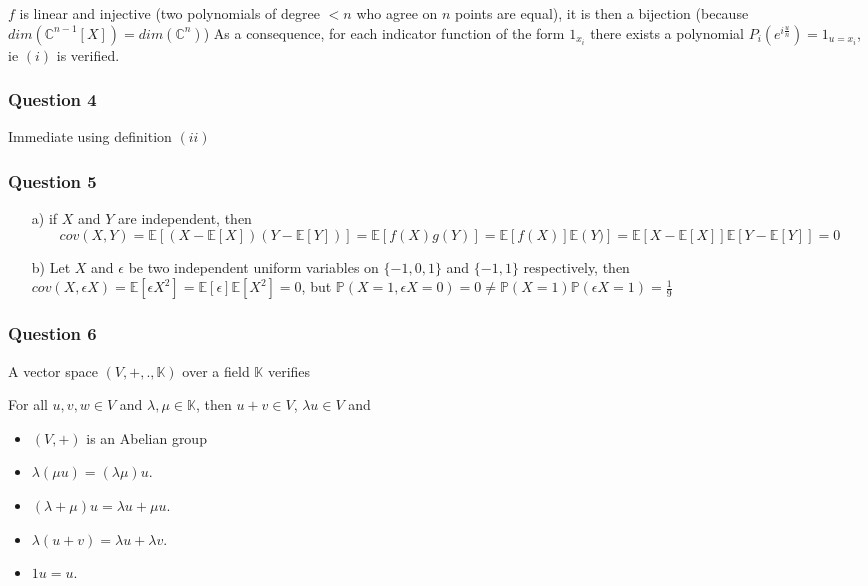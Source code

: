 \documentclass[12pt]{article}
\newcommand{\Q}[1]{\subsubsection*{Question #1}}
\begin{document}
$f$ is linear and injective (two polynomials of degree $< n$ who agree on $n$ points are equal), it is then a bijection (because $dim(\mathbb{C}^{n-1}[X]) = dim( \mathbb{C}^n )$)
As a consequence, for each indicator function of the form $1_{x_i}$ there exists a polynomial $P_i(e^{i \frac{u}{n}}) = 1_{u = x_i}$, ie $(i)$ is verified.

\Q{4} 
Immediate using definition $(ii)$

\Q{5}
\begin{itemize}
\item [a)] if $X$ and $Y$ are independent, then
  $$cov(X, Y) = \mathbb{E}\left[(X - \mathbb{E}[X]) (Y - \mathbb{E}[Y]) \right] = \mathbb{E}\left[f(X)g(Y) \right] = \mathbb{E}\left[f(X) \right]\mathbb{E}\left(Y) \right] = \mathbb{E}[X - \mathbb{E}[X]] \mathbb{E}[Y - \mathbb{E}[Y]] = 0$$
\item [b)] Let $X$ and $\epsilon$ be two independent uniform variables on $\{-1, 0, 1\}$ and $\{-1, 1\}$ respectively, then $cov(X, \epsilon X) = \mathbb{E}[\epsilon X^2]  = \mathbb{E}[\epsilon] \mathbb{E}[X^2] = 0$, but $\mathbb{P}(X = 1, \epsilon X = 0) = 0 \neq \mathbb{P}(X = 1) \mathbb{P}(\epsilon X = 1) = \frac{1}{9}$
\end{itemize}

\Q{6}
A vector space $(V,+,.,{\mathbb K})$ over a field $\mathbb K$ verifies

For all $u,v,w\in V$ and $\lambda, \mu \in \mathbb K$, then $u+v\in V$, $\lambda u\in V$ and

\begin{itemize}
\item $(V,+)$ is an Abelian group
\item $\lambda(\mu u)=(\lambda\mu)u$.
\item $(\lambda+\mu)u=\lambda u+\mu u$.
\item  $\lambda(u+v)=\lambda u+\lambda v$.
\item $1u=u$.
\end{itemize}
\end{document}
